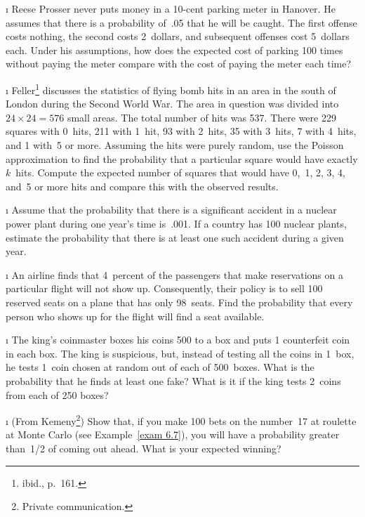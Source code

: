\begin{LJSItem}
\i\label{exer 5.1.119} Reese Prosser never puts money in a 10-cent parking
meter in Hanover.  He assumes that there is a probability of~.05 that he will be caught.  The
first offense costs nothing, the second costs 2~dollars, and subsequent offenses cost
5~dollars each.  Under his assumptions, how does the expected cost of parking 100
times without paying the meter compare with the cost of paying the meter each time?

\i\label{exer 9.2.15} Feller\footnote{ibid., p.~161.} discusses the
statistics of flying bomb hits in an area in the south of London during the
Second World War.  The area in question was divided into
$24 \times 24 = 576$ small areas.  The total number of hits was 537.  There were 229
squares with 0~hits, 211 with 1~hit, 93 with 2~hits, 35 with 3~hits, 7 with 4~hits,
and 1 with~5 or more.  Assuming the hits were purely random, use the Poisson
approximation to find the probability that a particular square would have exactly
$k$~hits.  Compute the expected number of squares that would have 0,~1, 2, 3, 4, and~5
or more hits and compare this with the observed results.

\i\label{exer 5.1.120} Assume that the probability that there is a significant accident
in a nuclear power plant during one year's time is~.001.  If a country has 100 nuclear
plants, estimate the probability that there is at least one such accident during a
given year.

\i\label{exer 5.1.121} An airline finds that 4~percent of the passengers that make
reservations on a particular flight will not show up.  Consequently, their policy is
to sell 100 reserved seats on a plane that has only 98~seats.  Find the probability
that every person who shows up for the flight will find a seat available.

\i\label{exer 5.1.122} The king's coinmaster boxes his coins 500 to a box and puts 1
counterfeit coin in each box.  The king is suspicious, but, instead of testing all the
coins in 1~box, he tests 1~coin chosen at random out of each of 500~boxes.  What is the
probability that he finds at least one fake?  What is it if the king tests 2~coins
from each of 250 boxes?

\i\label{exer 5.1.123} (From Kemeny\footnote{Private communication.}) Show that, if you make
100 bets on the number~17 at roulette at Monte Carlo (see Example~\ref{exam 6.7}),
you will have a probability greater than~1/2 of coming out ahead.  What is your
expected winning?


\end{LJSItem}
